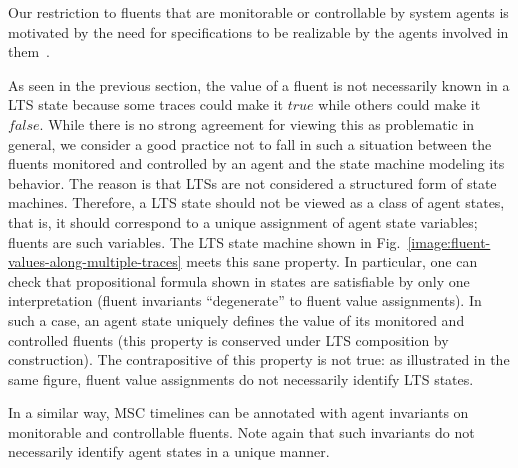Our restriction to fluents that are monitorable or controllable by system agents is motivated by the need for specifications  to be realizable by the agents involved in them~\cite{Letier:2002}.

As seen in the previous section, the value of a fluent is not necessarily known in a LTS state because some traces could make it $true$ while others could make it $false$. While there is no strong agreement for viewing this as problematic in general, we consider a good practice not to fall in such a situation between the fluents monitored and controlled by an agent and the state machine modeling its behavior. The reason is that LTSs are not considered a structured form of state machines. Therefore, a LTS state should not be viewed as a class of agent states, that is, it should correspond to a unique assignment of agent state variables; fluents are such variables. The LTS state machine shown in Fig.~\ref{image:fluent-values-along-multiple-traces} meets this sane property. In particular, one can check that propositional formula shown in states are satisfiable by only one interpretation (fluent invariants ``degenerate'' to fluent value assignments). In such a case, an agent state uniquely defines the value of its monitored and controlled fluents (this property is conserved under LTS composition by construction). The contrapositive of this property is not true: as illustrated in the same figure, fluent value assignments do not necessarily identify LTS states.

In a similar way, MSC timelines can be annotated with agent invariants on monitorable and controllable fluents. Note again that such invariants do not necessarily identify agent states in a unique manner.
